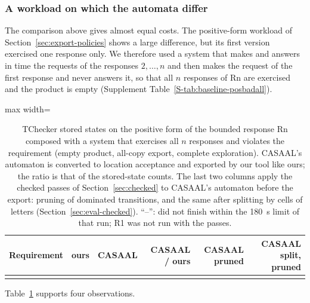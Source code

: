 \subsubsection{A workload on which the automata differ}
\label{sec:casaal-stress}
The comparison above gives almost equal costs. The positive-form workload of Section~\ref{sec:export-policies} shows a large difference, but its first version exercised one response only. We therefore used a system that makes and answers in time the requests of the responses $2,\dots,n$ and then makes the request of the first response and never answers it, so that all $n$ responses of Rn are exercised and the product is empty (Supplement Table~\ref{S-tab:baseline-posbadall}).

\begin{table}[tp]
\centering
\caption{TChecker stored states on the positive form of the bounded response Rn composed with a system that exercises all $n$ responses and violates the requirement (empty product, all-copy export, complete exploration). CASAAL's automaton is converted to location acceptance and exported by our tool like ours; the ratio is that of the stored-state counts. The last two columns apply the checked passes of Section~\ref{sec:checked} to CASAAL's automaton before the export: pruning of dominated transitions, and the same after splitting by cells of letters (Section~\ref{sec:eval-checked}).  ``--'': did not finish within the 180~s limit of that run; R1 was not run with the passes.}
\label{tab:stress}
\small
\begin{adjustbox}{max width=\textwidth}\begin{tabular}{@{}lrrrrr@{}}
\toprule
Requirement & ours & CASAAL & CASAAL / ours & CASAAL pruned & CASAAL split, pruned \\
\midrule
\\
\bottomrule
\end{tabular}\end{adjustbox}
\end{table}
Table~\ref{tab:stress} supports four observations.
